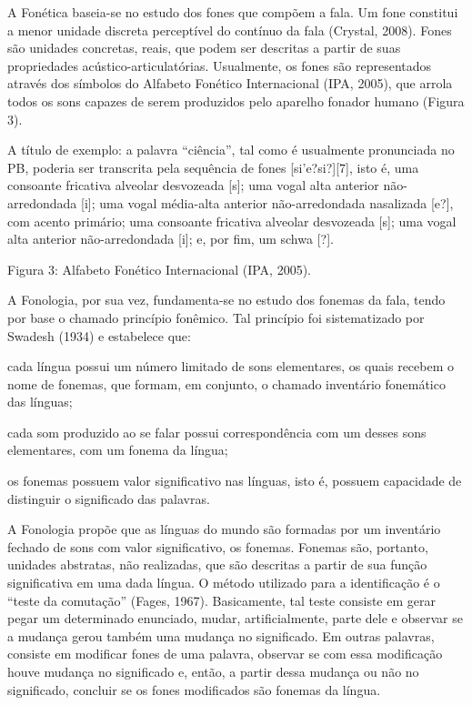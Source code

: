A Fon\'etica baseia-se no estudo dos fones que comp\~oem a fala. Um fone
constitui a menor unidade discreta percept\'ivel do cont\'inuo da fala
(Crystal, 2008). Fones s\~ao unidades concretas, reais, que podem ser
descritas a partir de suas propriedades ac\'ustico-articulat\'orias.
Usualmente, os fones s\~ao representados atrav\'es dos s\'imbolos do Alfabeto
Fon\'etico Internacional (IPA, 2005), que arrola todos os sons capazes de
serem produzidos pelo aparelho fonador humano (Figura 3).

A t\'itulo de exemplo: a palavra ``ci\^encia'', tal como \'e usualmente
pronunciada no PB, poderia ser transcrita pela sequ\^encia de fones
{[}si'e?si?{]}{[}7{]}, isto \'e, uma consoante fricativa alveolar
desvozeada {[}s{]}; uma vogal alta anterior n\~ao-arredondada {[}i{]}; uma
vogal m\'edia-alta anterior n\~ao-arredondada nasalizada {[}e?{]}, com
acento prim\'ario; uma consoante fricativa alveolar desvozeada {[}s{]};
uma vogal alta anterior n\~ao-arredondada {[}i{]}; e, por fim, um schwa
{[}?{]}.


Figura 3: Alfabeto Fon\'etico Internacional (IPA, 2005).

A Fonologia, por sua vez, fundamenta-se no estudo dos fonemas da fala,
tendo por base o chamado princ\'ipio fon\^emico. Tal princ\'ipio foi
sistematizado por Swadesh (1934) e estabelece que:

cada l\'ingua possui um n\'umero limitado de sons elementares, os quais
recebem o nome de fonemas, que formam, em conjunto, o chamado invent\'ario
fonem\'atico das l\'inguas;

cada som produzido ao se falar possui correspond\^encia com um desses sons
elementares, com um fonema da l\'ingua;

os fonemas possuem valor significativo nas l\'inguas, isto \'e, possuem
capacidade de distinguir o significado das palavras.

A Fonologia prop\~oe que as l\'inguas do mundo s\~ao formadas por um
invent\'ario fechado de sons com valor significativo, os fonemas. Fonemas
s\~ao, portanto, unidades abstratas, n\~ao realizadas, que s\~ao descritas a
partir de sua fun\c{c}\~ao significativa em uma dada l\'ingua. O m\'etodo
utilizado para a identifica\c{c}\~ao \'e o ``teste da comuta\c{c}\~ao'' (Fages, 1967).
Basicamente, tal teste consiste em gerar pegar um determinado enunciado,
mudar, artificialmente, parte dele e observar se a mudan\c{c}a gerou tamb\'em
uma mudan\c{c}a no significado. Em outras palavras, consiste em modificar
fones de uma palavra, observar se com essa modifica\c{c}\~ao houve mudan\c{c}a no
significado e, ent\~ao, a partir dessa mudan\c{c}a ou n\~ao no significado,
concluir se os fones modificados s\~ao fonemas da l\'ingua.

